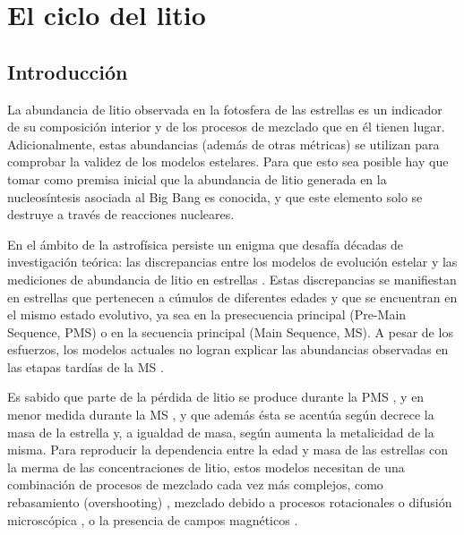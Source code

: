 
\chapter{El ciclo del litio}\label{ch:segundo-capitulo}

\section{Introducción}
La abundancia de litio observada en la fotosfera de las estrellas es un indicador de su composición interior y de los procesos de mezclado que en él tienen lugar. Adicionalmente, estas abundancias (además de otras métricas) se utilizan para comprobar la validez de los modelos estelares. Para que esto sea posible hay que tomar como premisa inicial que la abundancia de litio generada en la nucleosíntesis asociada al Big Bang es conocida, y que este elemento solo se destruye a través de reacciones nucleares.\par 

En el ámbito de la astrofísica persiste un enigma que desafía décadas de investigación teórica: las discrepancias entre los modelos de evolución estelar y las mediciones de abundancia de litio en estrellas \citep{Tschape2001}. Estas discrepancias se manifiestan en estrellas que pertenecen a cúmulos de diferentes edades y que se encuentran en el mismo estado evolutivo, ya sea en la presecuencia principal (Pre-Main Sequence, PMS) o en la secuencia principal (Main Sequence, MS). A pesar de los esfuerzos, los modelos actuales no logran explicar las abundancias observadas en las etapas tardías de la MS .\par

Es sabido que parte de la pérdida de litio se produce durante la PMS \cite{Jeffries2004}, y en menor medida durante la MS \citep{Jeffries2014}, y que además ésta se acentúa según decrece la masa de la estrella y, a igualdad de masa, según aumenta la metalicidad de la misma. Para reproducir la dependencia entre la edad y masa de las estrellas con la merma de las concentraciones de litio, estos modelos necesitan de una combinación de procesos de mezclado cada vez más complejos, como rebasamiento (overshooting) \citep{Baraffe2010}, mezclado debido a procesos rotacionales \citep{Gallet2013} o difusión microscópica \citep{Denissenkov2010, Eggenberger2012}, o la presencia de campos magnéticos \citep{Gallet2013, Gallet2015}.\par

